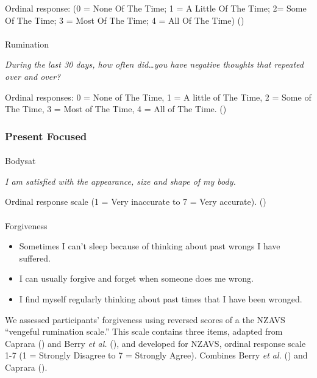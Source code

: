\documentclass[
  single column]{article}
\makeatletter
\let\oldparagraph\paragraph
\renewcommand{\paragraph}{
    \@ifstar
      \xxxParagraphStar
      \xxxParagraphNoStar
  }
\newcommand{\xxxParagraphStar}[1]{\oldparagraph*{#1}\mbox{}}
\newcommand{\xxxParagraphNoStar}[1]{\oldparagraph{#1}\mbox{}}
\providecommand{\tightlist}{%
  \setlength{\itemsep}{0pt}\setlength{\parskip}{0pt}}\usepackage{longtable,booktabs,array}
\makeatother
\begin{document}
Ordinal response: (0 = None Of The Time; 1 = A Little Of The Time; 2=
Some Of The Time; 3 = Most Of The Time; 4 = All Of The Time)
()

\paragraph{Rumination}\label{rumination}

\emph{During the last 30 days, how often did\ldots you have negative
thoughts that repeated over and over?}

Ordinal responses: 0 = None of The Time, 1 = A little of The Time, 2 =
Some of The Time, 3 = Most of The Time, 4 = All of The Time.
()

\subsubsection{Present Focused}\label{present-focused}

\paragraph{Bodysat}\label{bodysat}

\emph{I am satisfied with the appearance, size and shape of my body.}

Ordinal response scale (1 = Very inaccurate to 7 = Very accurate).
()

\paragraph{Forgiveness}\label{forgiveness}

\begin{itemize}
\tightlist
\item
  Sometimes I can't sleep because of thinking about past wrongs I have
  suffered.
\item
  I can usually forgive and forget when someone does me wrong.
\item
  I find myself regularly thinking about past times that I have been
  wronged.
\end{itemize}

We assessed participants' forgiveness using reversed scores of a the
NZAVS ``vengeful rumination scale.'' This scale contains three items,
adapted from Caprara () and
Berry \emph{et al.} (), and
developed for NZAVS, ordinal response scale 1-7 (1 = Strongly Disagree
to 7 = Strongly Agree). Combines Berry \emph{et al.}
() and Caprara
().
\end{document}
